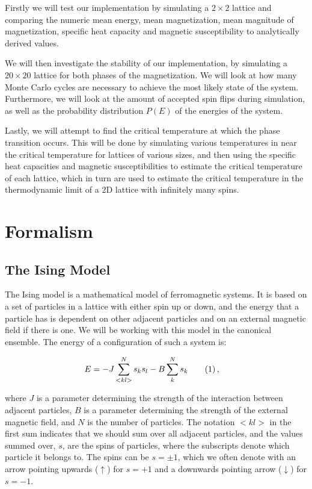 \documentclass[reprint,english,notitlepage]{revtex4-1}  %
\newcommand\numberthis{\addtocounter{equation}{1}\tag{\theequation}}
\begin{document}
Firstly we will test our implementation by simulating a \(2\times 2\) lattice and comparing the numeric mean energy, mean magnetization, mean magnitude of magnetization, specific heat capacity and magnetic susceptibility to analytically derived values.

We will then investigate the stability of our implementation, by simulating a \(20\times 20\) lattice for both phases of the magnetization. We will look at how many Monte Carlo cycles are necessary to achieve the most likely state of the system. Furthermore, we will look at the amount of accepted spin flips during simulation, as well as the probability distribution \(P(E)\) of the energies of the system.

Lastly, we will attempt to find the critical temperature at which the phase transition occurs. This will be done by simulating various temperatures in near the critical temperature for lattices of various sizes, and then using the specific heat capacities and magnetic susceptibilities to estimate the critical temperature of each lattice, which in turn are used to estimate the critical temperature in the thermodynamic limit of a 2D lattice with infinitely many spins.


\newpage

\section{Formalism} \label{sec:II}

\subsection{The Ising Model} \label{sec:II:a}

The Ising model is a mathematical model of ferromagnetic systems. It is based on a set of particles in a lattice with either spin up or down, and the energy that a particle has is dependent on other adjacent particles and on an external magnetic field if there is one. We will be working with this model in the canonical ensemble. The energy of a configuration of such a system is:

\begin{align*}
E &= -J \sum\limits_{<kl>}^N s_k s_l - B \sum\limits_k^N s_k \numberthis \label{eq:ising_general_total_energy} \, ,
\end{align*}

where $J$ is a parameter determining the strength of the interaction between adjacent particles, $B$ is a parameter determining the strength of the external magnetic field, and $N$ is the number of particles. The notation $<kl>$ in the first sum indicates that we should sum over all adjacent particles, and the values summed over, $s$, are the spins of particles, where the subscripts denote which particle it belongs to. The spins can be $s = \pm 1$, which we often denote with an arrow pointing upwards ($\uparrow$) for $s = +1$ and a downwards pointing arrow ($\downarrow$) for $s = -1$.
\end{document}
